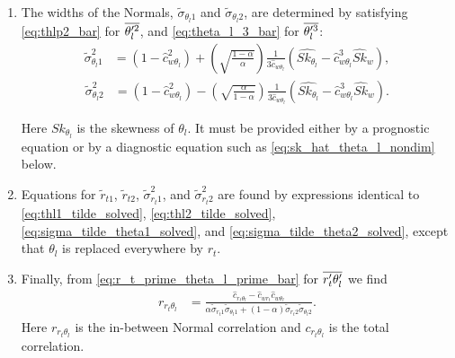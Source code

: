 \begin{enumerate}
    \item The widths of the Normals, $\tilde{\sigma}_{\theta_l 1}$ and $\tilde{\sigma}_{\theta_l 2}$, are determined by satisfying \cref{eq:thlp2_bar} for $\overline{\theta_l'^2}$, and \cref{eq:theta_l_3_bar} for $\overline{\theta_l'^3}$:
    \begin{align}
        \label{eq:sigma_tilde_theta1_solved}
        \tilde{\sigma}_{\theta_l 1}^2
        &= \left(1-\widehat{c}_{w \theta_l}^2 \right) + \left(\sqrt{\frac{1 - \alpha}{\alpha}}\right) \frac{1}{3 \widehat{c}_{w \theta_l}} \left( \widehat{Sk_{\theta_l}} - \widehat{c}_{w \theta_l}^3 \widehat{Sk}_w \right),
    \end{align}
    \begin{align}
        \label{eq:sigma_tilde_theta2_solved}
        \tilde{\sigma}_{\theta_l 2}^2
        &= \left(1 - \widehat{c}_{w \theta_l}^2 \right) - \left(\sqrt{\frac{\alpha}{1 - \alpha}}\right) \frac{1}{3 \widehat{c}_{w \theta_l}} \left( \widehat{Sk_{\theta_l}} - \widehat{c}_{w \theta_l}^3 \widehat{Sk}_w \right).
    \end{align}

    Here $Sk_{\theta_l}$ is the skewness of $\theta_l$.
    It must be provided either by a prognostic equation or by a diagnostic equation such as \cref{eq:sk_hat_theta_l_nondim} below.

    \item Equations for $\tilde{r}_{t1}$, $\tilde{r}_{t2}$, $\tilde{\sigma}_{r_t 1}^2$, and $\tilde{\sigma}_{r_t 2}^2$ are found by expressions identical to \cref{eq:thl1_tilde_solved}, \cref{eq:thl2_tilde_solved}, \cref{eq:sigma_tilde_theta1_solved}, and \cref{eq:sigma_tilde_theta2_solved}, except that $\theta_l$ is replaced everywhere by $r_t$.

    \item Finally, from \cref{eq:r_t_prime_theta_l_prime_bar} for $\overline{r_t' \theta_l'}$ we find
    \begin{align}
        \label{eq:r_r_t_theta_l}
        r_{r_t \theta_l}
        &= \frac{\widehat{c}_{r_t \theta_l} - \widehat{c}_{w r_t} \widehat{c}_{w \theta_l}}{\alpha \tilde{\sigma}_{r_{t}1}\tilde{\sigma}_{\theta_{l}1} + (1-\alpha) \tilde{\sigma}_{r_{t}2} \tilde{\sigma}_{\theta_{l}2}}.
    \end{align}
    Here $r_{r_t \theta_l}$ is the in-between Normal correlation and $c_{r_t \theta_l}$ is the total correlation.
\end{enumerate}